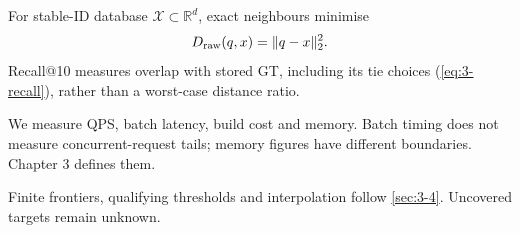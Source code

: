 For stable-ID database $\mathcal X\subset\mathbb R^d$, exact neighbours minimise
\begin{equation}
 D_{\mathrm{raw}}(q,x)=\|q-x\|_2^2.
 \label{eq:2-raw}
\end{equation}
Recall@10 measures overlap with stored GT, including its tie choices (\cref{eq:3-recall}), rather than a worst-case distance ratio.

We measure QPS, batch latency, build cost and memory. Batch timing does not measure concurrent-request tails; memory figures have different boundaries. Chapter 3 defines them.

Finite frontiers, qualifying thresholds and interpolation follow \cref{sec:3-4}. Uncovered targets remain unknown.